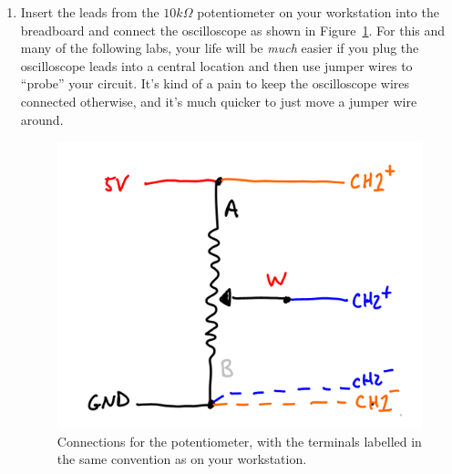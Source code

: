 \documentclass[11pt]{article} %
\begin{document}
\begin{enumerate}
\item Insert the leads from the $10k\Omega$ potentiometer on your workstation into the breadboard and connect the oscilloscope as shown in Figure~\ref{fig:potentiometer}.
For this and many of the following labs, your life will be \emph{much} easier if you plug the oscilloscope leads into a central location and then use jumper wires to “probe” your circuit. It’s kind of a pain to keep the oscilloscope wires connected otherwise, and it’s much quicker to just move a jumper wire around.

\begin{figure}[htbp]
\begin{center}
\includegraphics{figures/potentiometer}
\caption{Connections for the potentiometer, with the terminals labelled in the same convention as on your workstation.}
\label{fig:potentiometer}
\end{center}
\end{figure}


\end{enumerate}
\end{document}
